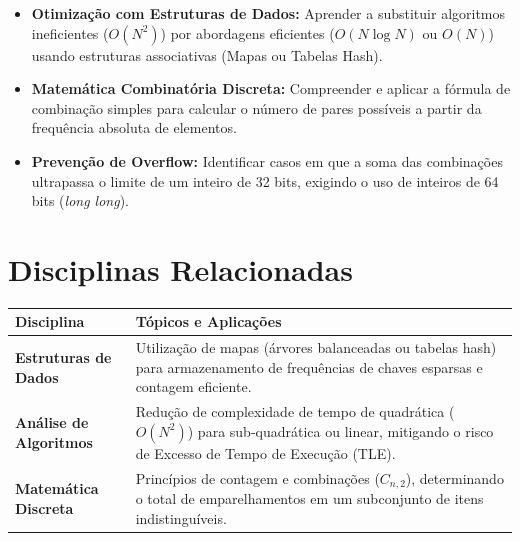 \documentclass[11pt]{article}
\begin{document}

\begin{objetivobox}
\begin{itemize}
    \item \textbf{Otimização com Estruturas de Dados:} Aprender a substituir algoritmos ineficientes ($O(N^2)$) por abordagens eficientes ($O(N \log N)$ ou $O(N)$) usando estruturas associativas (Mapas ou Tabelas Hash).
    \item \textbf{Matemática Combinatória Discreta:} Compreender e aplicar a fórmula de combinação simples para calcular o número de pares possíveis a partir da frequência absoluta de elementos.
    \item \textbf{Prevenção de Overflow:} Identificar casos em que a soma das combinações ultrapassa o limite de um inteiro de 32 bits, exigindo o uso de inteiros de 64 bits (\textit{long long}).
\end{itemize}
\end{objetivobox}

\section*{Disciplinas Relacionadas}

\begin{table}[h]
\centering
\begin{tabularx}{\textwidth}{|>{\raggedright\arraybackslash}p{4cm}|X|}
\hline
\textbf{Disciplina} & \textbf{Tópicos e Aplicações} \\
\hline
\textbf{Estruturas de Dados} & Utilização de mapas (árvores balanceadas ou tabelas hash) para armazenamento de frequências de chaves esparsas e contagem eficiente. \\
\hline
\textbf{Análise de Algoritmos} & Redução de complexidade de tempo de quadrática ($O(N^2)$) para sub-quadrática ou linear, mitigando o risco de Excesso de Tempo de Execução (TLE). \\
\hline
\textbf{Matemática Discreta} & Princípios de contagem e combinações ($C_{n, 2}$), determinando o total de emparelhamentos em um subconjunto de itens indistinguíveis. \\
\hline
\end{tabularx}
\end{table}

\end{document}
